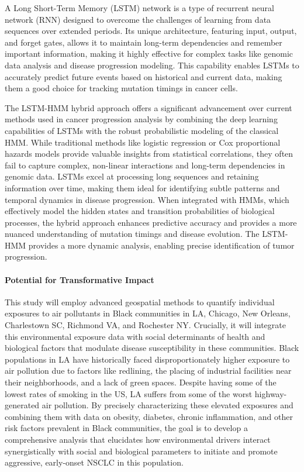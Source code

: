 A Long Short-Term Memory (LSTM) network is a type of recurrent neural network (RNN) 
designed to overcome the challenges of learning from data sequences over extended periods. 
Its unique architecture, featuring input, output, and forget gates, allows it to maintain long-term dependencies 
and remember important information, making it highly effective for complex tasks like genomic data analysis 
and disease progression modeling. 
This capability enables LSTMs to accurately predict future events based on historical and current data, 
making them a good choice for tracking mutation timings in cancer cells.

The LSTM-HMM hybrid approach offers a significant advancement over current methods used in cancer progression analysis 
by combining the deep learning capabilities of LSTMs with the robust probabilistic modeling of the classical HMM. 
While traditional methods like logistic regression or Cox proportional hazards models provide valuable insights from statistical correlations, 
they often fail to capture complex, non-linear interactions and long-term dependencies in genomic data. 
LSTMs excel at processing long sequences and retaining information over time, 
making them ideal for identifying subtle patterns and temporal dynamics in disease progression. 
When integrated with HMMs, which effectively model the hidden states and transition probabilities of biological processes, 
the hybrid approach enhances predictive accuracy and provides a more nuanced understanding of mutation timings and disease evolution. 
The LSTM-HMM provides a more dynamic analysis, enabling precise identification of tumor progression.

\paragraph{Potential for Transformative Impact}

This study will employ advanced geospatial methods to quantify individual exposures to air pollutants 
in Black communities in LA, Chicago, New Orleans, Charlestown SC, Richmond VA, and Rochester NY. 
Crucially, it will integrate this environmental exposure data with social determinants of health and biological factors 
that modulate disease susceptibility in these communities. 
Black populations in LA have historically faced disproportionately higher exposure to air pollution 
due to factors like redlining, the placing of industrial facilities near their neighborhoods, and a lack of green spaces. 
Despite having some of the lowest rates of smoking in the US, LA suffers from some of the worst highway-generated air pollution. 
By precisely characterizing these elevated exposures and combining them with data on 
obesity, diabetes, chronic inflammation, and other risk factors prevalent in Black communities, 
the goal is to develop a comprehensive analysis that elucidates how environmental drivers interact synergistically with 
social and biological parameters to initiate and promote aggressive, early-onset NSCLC in this population. 

